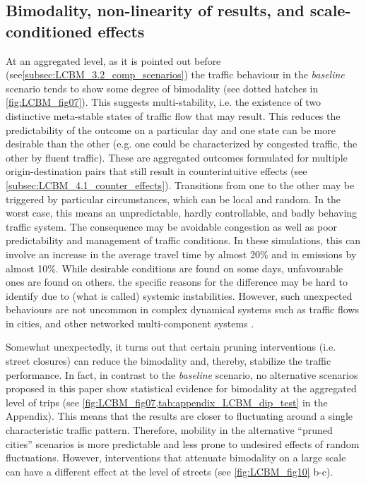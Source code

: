 \subsection{Bimodality, non-linearity of results, and scale-conditioned effects}
\label{subsec:LCBM_4.3_sys_stability}

At an aggregated level, as it is pointed out before (see\cref{subsec:LCBM_3.2_comp_scenarios}) the traffic behaviour in the \emph{baseline} scenario tends to show some degree of bimodality (see dotted hatches in \cref{fig:LCBM_fig07}). This suggests multi-stability, i.e. the existence of two distinctive meta-stable states of traffic flow that may result. This reduces the predictability of the outcome on a particular day and one state can be more desirable than the other (e.g. one could be characterized by congested traffic, the other by fluent traffic). These are aggregated outcomes formulated for multiple origin-destination pairs that still result in counterintuitive effects (see \cref{subsec:LCBM_4.1_counter_effects}). Transitions from one to the other may be triggered by particular circumstances, which can be local and random. In the worst case, this means an unpredictable, hardly controllable, and badly behaving traffic system. The consequence may be avoidable congestion as well as poor predictability and management of traffic conditions. In these simulations, this can involve an increase in the average travel time by almost 20\% and in emissions by almost 10\%. While desirable conditions are found on some days, unfavourable ones are found on others. the specific reasons for the difference may be hard to identify due to (what is called) systemic instabilities. However, such unexpected behaviours are not uncommon in complex dynamical systems such as traffic flows in cities, and other networked multi-component systems \citep{Helbing2012}. 

Somewhat unexpectedly, it turns out that certain pruning interventions (i.e. street closures) can reduce the bimodality and, thereby, stabilize the traffic performance. In fact, in contrast to the \emph{baseline} scenario, no alternative scenarios proposed in this paper show statistical evidence for bimodality at the aggregated level of trips (see \cref{fig:LCBM_fig07,tab:appendix_LCBM_dip_test} in the Appendix). This means that the results are closer to fluctuating around a single characteristic traffic pattern. Therefore, mobility in the alternative “pruned cities” scenarios is more predictable and less prone to undesired effects of random fluctuations. However, interventions that attenuate bimodality on a large scale can have a different effect at the level of streets (see \cref{fig:LCBM_fig10} b-c).

